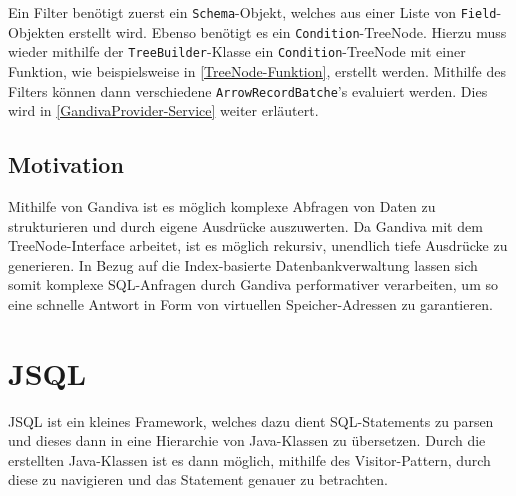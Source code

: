 Ein Filter benötigt zuerst ein \texttt{Schema}-Objekt, welches aus einer Liste von \texttt{Field}-Objekten erstellt wird. Ebenso benötigt es ein \texttt{Condition}-TreeNode.
Hierzu muss wieder mithilfe der \texttt{TreeBuilder}-Klasse ein \texttt{Condition}-TreeNode mit einer Funktion, wie beispielsweise in \ref{TreeNode-Funktion}, erstellt werden.
Mithilfe des Filters können dann verschiedene \texttt{ArrowRecordBatche}'s evaluiert werden. Dies wird in \ref{GandivaProvider-Service} weiter erläutert.

\subsection{Motivation}

Mithilfe von Gandiva ist es möglich komplexe Abfragen von Daten zu strukturieren und durch eigene Ausdrücke auszuwerten. Da Gandiva mit dem TreeNode-Interface arbeitet, ist es möglich rekursiv, unendlich tiefe Ausdrücke zu generieren. In Bezug auf die Index-basierte Datenbankverwaltung lassen sich somit komplexe SQL-Anfragen durch Gandiva performativer verarbeiten, um so eine schnelle Antwort in Form von virtuellen Speicher-Adressen zu garantieren. 


\section{JSQL}

JSQL ist ein kleines Framework, welches dazu dient SQL-Statements zu parsen und dieses dann in eine Hierarchie von Java-Klassen zu übersetzen.
Durch die erstellten Java-Klassen ist es dann möglich, mithilfe des Visitor-Pattern, durch diese zu navigieren und das Statement genauer zu betrachten.\cite{wumpz:JSQLParser} 
